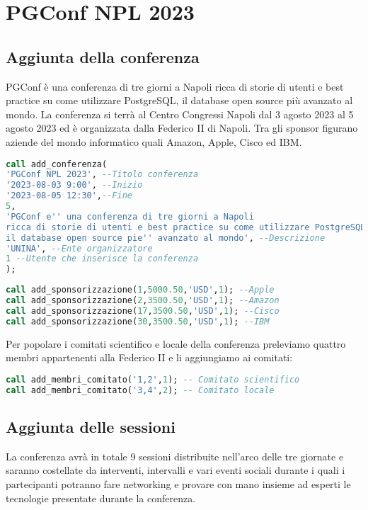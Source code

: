 \section{PGConf NPL 2023}
\subsection{Aggiunta della conferenza}
PGConf è una conferenza di tre giorni a Napoli ricca di storie di utenti e best practice su come utilizzare PostgreSQL, il database open source più avanzato al mondo. La conferenza si terrà al Centro Congressi Napoli dal 3 agosto 2023 al 5 agosto 2023 ed è organizzata dalla Federico II di Napoli. Tra gli sponsor figurano aziende del mondo informatico quali Amazon, Apple, Cisco ed IBM. 
\begin{lstlisting}[language=SQL, style=mystyle,caption={Aggiunta della conferenza}]
call add_conferenza(
'PGConf NPL 2023', --Titolo conferenza
'2023-08-03 9:00', --Inizio
'2023-08-05 12:30',--Fine
5,
'PGConf e'' una conferenza di tre giorni a Napoli 
ricca di storie di utenti e best practice su come utilizzare PostgreSQL, 
il database open source pie'' avanzato al mondo', --Descrizione
'UNINA', --Ente organizzatore
1 --Utente che inserisce la conferenza 
);
\end{lstlisting}
\begin{lstlisting}[language=SQL,style=mystyle,caption={Aggiunta delle sponsorizzazioni}]
call add_sponsorizzazione(1,5000.50,'USD',1); --Apple
call add_sponsorizzazione(2,3500.50,'USD',1); --Amazon
call add_sponsorizzazione(17,3500.50,'USD',1); --Cisco
call add_sponsorizzazione(30,3500.50,'USD',1); --IBM
\end{lstlisting}
Per popolare i comitati scientifico e locale della conferenza preleviamo quattro membri appartenenti alla Federico II e li aggiungiamo ai comitati:
\begin{lstlisting}[caption={Aggiunta degli organizzatori nei comitati scientifici e locali della conferenza},language=sql,style=mystyle]
call add_membri_comitato('1,2',1); -- Comitato scientifico
call add_membri_comitato('3,4',2); -- Comitato locale
\end{lstlisting}
\subsection{Aggiunta delle sessioni}
La conferenza avrà in totale 9 sessioni distribuite nell'arco delle tre giornate e saranno costellate da interventi, intervalli e vari eventi sociali durante i quali i partecipanti potranno fare networking e provare con mano insieme ad esperti le tecnologie presentate durante la conferenza.
